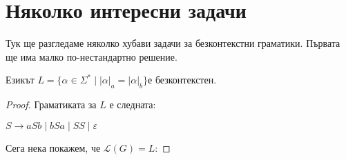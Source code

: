 \section{Няколко интересни задачи}

Тук ще разгледаме няколко хубави задачи за безконтекстни граматики.
Първата ще има малко по-нестандартно решение.

\begin{claim}
    Езикът $L = \{ \alpha \in \Sigma^* \mid |\alpha|_a = |\alpha|_b \}$е безконтекстен.
\end{claim}

\begin{proof}
    Граматиката за $L$ е следната:

    \begin{center}
        $S \rightarrow aSb \mid bSa \mid SS \mid \varepsilon$
    \end{center}

    Сега нека покажем, че $\mathcal{L}(G) = L$:


\end{proof}
